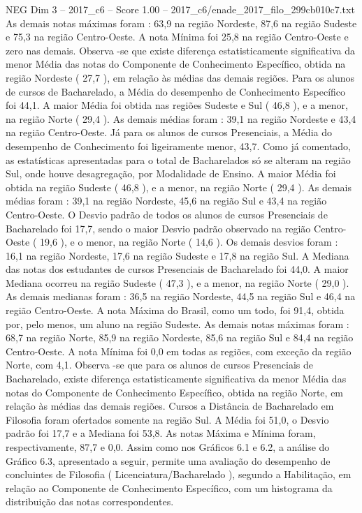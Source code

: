 \begin{textsample}{NEG Dim 3 – 2017\_c6 – Score 1.00 – 2017\_c6/enade\_2017\_filo\_299cb010c7.txt}
As demais notas máximas foram : 63,9 na região Nordeste, 87,6 na região Sudeste e 75,3 na região Centro-Oeste.
A nota Mínima foi 25,8 na região Centro-Oeste e zero nas demais.
Observa -se que existe diferença estatisticamente significativa da menor Média das notas do Componente de Conhecimento Específico, obtida na região Nordeste ( 27,7 ), em relação às médias das demais regiões.
Para os alunos de cursos de Bacharelado, a Média do desempenho de Conhecimento Específico foi 44,1.
A maior Média foi obtida nas regiões Sudeste e Sul ( 46,8 ), e a menor, na região Norte ( 29,4 ).
As demais médias foram : 39,1 na região Nordeste e 43,4 na região Centro-Oeste.
Já para os alunos de cursos Presenciais, a Média do desempenho de Conhecimento foi ligeiramente menor, 43,7.
Como já comentado, as estatísticas apresentadas para o total de Bacharelados só se alteram na região Sul, onde houve desagregação, por Modalidade de Ensino.
A maior Média foi obtida na região Sudeste ( 46,8 ), e a menor, na região Norte ( 29,4 ).
As demais médias foram : 39,1 na região Nordeste, 45,6 na região Sul e 43,4 na região Centro-Oeste.
O Desvio padrão de todos os alunos de cursos Presenciais de Bacharelado foi 17,7, sendo o maior Desvio padrão observado na região Centro-Oeste ( 19,6 ), e o menor, na região Norte ( 14,6 ).
Os demais desvios foram : 16,1 na região Nordeste, 17,6 na região Sudeste e 17,8 na região Sul.
A Mediana das notas dos estudantes de cursos Presenciais de Bacharelado foi 44,0.
A maior Mediana ocorreu na região Sudeste ( 47,3 ), e a menor, na região Norte ( 29,0 ).
As demais medianas foram : 36,5 na região Nordeste, 44,5 na região Sul e 46,4 na região Centro-Oeste.
A nota Máxima do Brasil, como um todo, foi 91,4, obtida por, pelo menos, um aluno na região Sudeste.
As demais notas máximas foram : 68,7 na região Norte, 85,9 na região Nordeste, 85,6 na região Sul e 84,4 na região Centro-Oeste.
A nota Mínima foi 0,0 em todas as regiões, com exceção da região Norte, com 4,1.
Observa -se que para os alunos de cursos Presenciais de Bacharelado, existe diferença estatisticamente significativa da menor Média das notas do Componente de Conhecimento Específico, obtida na região Norte, em relação às médias das demais regiões.
Cursos a Distância de Bacharelado em Filosofia foram ofertados somente na região Sul.
A Média foi 51,0, o Desvio padrão foi 17,7 e a Mediana foi 53,8.
As notas Máxima e Mínima foram, respectivamente, 87,7 e 0,0.
Assim como nos Gráficos 6.1 e 6.2, a análise do Gráfico 6.3, apresentado a seguir, permite uma avaliação do desempenho de concluintes de Filosofia ( Licenciatura/Bacharelado ), segundo a Habilitação, em relação ao Componente de Conhecimento Específico, com um histograma da distribuição das notas correspondentes.

\end{textsample}
